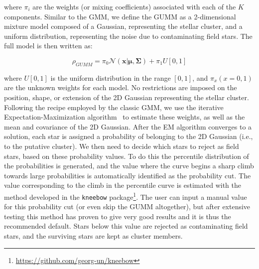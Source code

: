 \documentclass[draft]{aa}
\begin{document}
 \noindent where $\pi_i$ are the weights (or mixing coefficients)
 associated with each of the $K$ components. Similar to the GMM, we define the
 GUMM as a 2-dimensional mixture model composed of a Gaussian, representing
 the stellar cluster, and a uniform distribution, representing the noise due
 to contaminating field stars. The full model is then written as:

 \begin{equation}
 \rho_{GUMM}=
 \pi_{0} \mathcal{N}\left(\boldsymbol{\mathbf{x} | \mu}, \boldsymbol{\Sigma}\right)+
 \pi_{1} U[0,1]
 \end{equation}

 \noindent where $U[0,1]$ is the uniform distribution in the range $[0,1]$,
 and $\pi_{x} (x=0,1)$ are the unknown weights for each model.
 No restrictions are imposed on the position, shape, or
 extension of the 2D Gaussian representing the stellar cluster.
 Following the recipe employed by the classic GMM, we use the
 iterative Expectation-Maximization algorithm~\citep[EM,][]{dempster_1977} to
 estimate these  weights, as well as the mean and covariance of the 2D
 Gaussian. After the EM algorithm converges to a solution, each star is
 assigned a probability of belonging to the 2D Gaussian 
 (i.e., to the putative cluster). We then need to decide which stars to reject
 as field stars, based on these probability values. To do this the percentile
 distribution of the probabilities is generated, and the value
 where the curve begins a sharp climb towards large probabilities is
 automatically identified as the probability cut. The value
 corresponding to the climb in the percentile curve is estimated with the
 method developed in the \texttt{kneebow} package\footnote{
 \url{https://github.com/georg-un/kneebow}}. The user can input a
 manual value for this probability cut (or even skip the GUMM altogether), but
 after extensive testing this method has proven to give very good results and
 it is thus the recommended default.
 Stars below this value are rejected as contaminating field stars, and the
 surviving stars are kept as cluster members.
\end{document}

